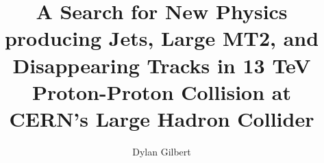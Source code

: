 %
%
%
%




\title{A Search for New Physics producing Jets, Large MT2, and Disappearing Tracks in 13 TeV Proton-Proton Collision at CERN's Large Hadron Collider}

\author{Dylan Gilbert}
\degreeyear{\the\year}




%



